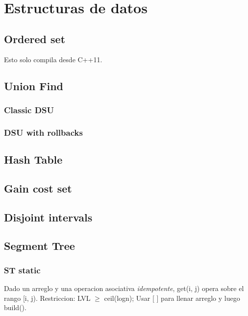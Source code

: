 \newpage
\section{Estructuras de datos}

\subsection{Ordered set}
Esto solo compila desde C++11.


\subsection{Union Find}

\subsubsection{Classic DSU}


\subsubsection{DSU with rollbacks}


\subsection{Hash Table}


\subsection{Gain cost set}


\subsection{Disjoint intervals}


\subsection{Segment Tree}
\subsubsection{ST static}
Dado un arreglo y una operacion asociativa \emph{idempotente}, get(i, j) opera sobre el rango [i, j). Restriccion: LVL $\ge$ ceil(logn); Usar [ ] para llenar arreglo y luego build().

